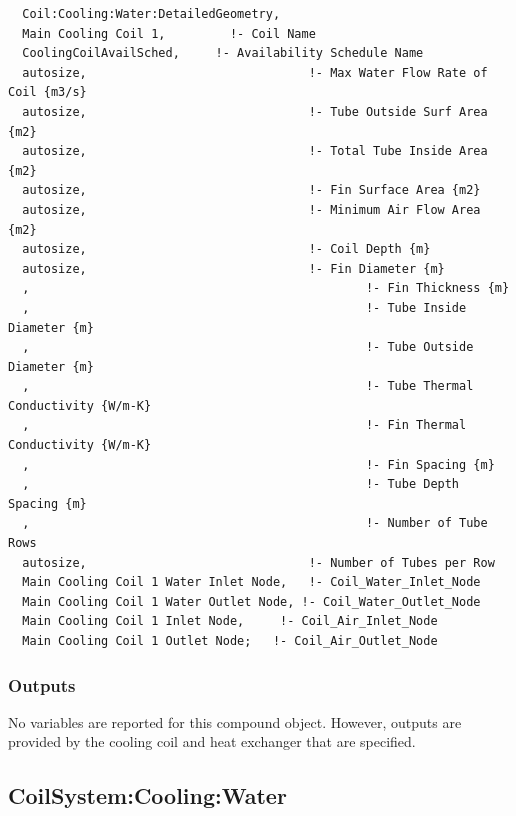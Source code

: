 \begin{lstlisting}
  Coil:Cooling:Water:DetailedGeometry,
  Main Cooling Coil 1,         !- Coil Name
  CoolingCoilAvailSched,     !- Availability Schedule Name
  autosize,                               !- Max Water Flow Rate of Coil {m3/s}
  autosize,                               !- Tube Outside Surf Area {m2}
  autosize,                               !- Total Tube Inside Area {m2}
  autosize,                               !- Fin Surface Area {m2}
  autosize,                               !- Minimum Air Flow Area {m2}
  autosize,                               !- Coil Depth {m}
  autosize,                               !- Fin Diameter {m}
  ,                                               !- Fin Thickness {m}
  ,                                               !- Tube Inside Diameter {m}
  ,                                               !- Tube Outside Diameter {m}
  ,                                               !- Tube Thermal Conductivity {W/m-K}
  ,                                               !- Fin Thermal Conductivity {W/m-K}
  ,                                               !- Fin Spacing {m}
  ,                                               !- Tube Depth Spacing {m}
  ,                                               !- Number of Tube Rows
  autosize,                               !- Number of Tubes per Row
  Main Cooling Coil 1 Water Inlet Node,   !- Coil_Water_Inlet_Node
  Main Cooling Coil 1 Water Outlet Node, !- Coil_Water_Outlet_Node
  Main Cooling Coil 1 Inlet Node,     !- Coil_Air_Inlet_Node
  Main Cooling Coil 1 Outlet Node;   !- Coil_Air_Outlet_Node
\end{lstlisting}

\subsubsection{Outputs}\label{outputs-22}

No variables are reported for this compound object. However, outputs are provided by the cooling coil and heat exchanger that are specified.

\subsection{CoilSystem:Cooling:Water}\label{coilsystemcoolingwater}

